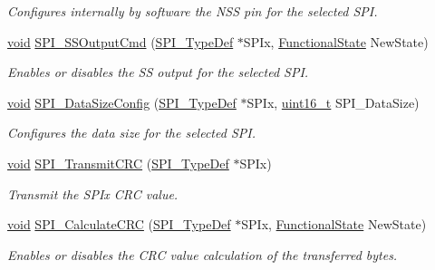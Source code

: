 \begin{DoxyCompactItemize}
\begin{DoxyCompactList}\small\item\em Configures internally by software the N\+SS pin for the selected S\+PI. \end{DoxyCompactList}\item 
\hyperlink{usb__devapi_8h_afabf60e7f57651d6d595a02c75f07cd0}{void} \hyperlink{group___s_p_i___private___functions_ga4ec54abdedf6cd17403d853a926d91c1}{S\+P\+I\+\_\+\+S\+S\+Output\+Cmd} (\hyperlink{struct_s_p_i___type_def}{S\+P\+I\+\_\+\+Type\+Def} $\ast$S\+P\+Ix, \hyperlink{agilefox_2library_2inc_2stm32f10x__type_8h_ac9a7e9a35d2513ec15c3b537aaa4fba1}{Functional\+State} New\+State)
\begin{DoxyCompactList}\small\item\em Enables or disables the SS output for the selected S\+PI. \end{DoxyCompactList}\item 
\hyperlink{usb__devapi_8h_afabf60e7f57651d6d595a02c75f07cd0}{void} \hyperlink{group___s_p_i___private___functions_gafc82e90841d7879535d655c035709cb1}{S\+P\+I\+\_\+\+Data\+Size\+Config} (\hyperlink{struct_s_p_i___type_def}{S\+P\+I\+\_\+\+Type\+Def} $\ast$S\+P\+Ix, \hyperlink{_p_e___types_8h_a1f1825b69244eb3ad2c7165ddc99c956}{uint16\+\_\+t} S\+P\+I\+\_\+\+Data\+Size)
\begin{DoxyCompactList}\small\item\em Configures the data size for the selected S\+PI. \end{DoxyCompactList}\item 
\hyperlink{usb__devapi_8h_afabf60e7f57651d6d595a02c75f07cd0}{void} \hyperlink{group___s_p_i___private___functions_gace8b1058e09bab150b0dbe5978810273}{S\+P\+I\+\_\+\+Transmit\+C\+RC} (\hyperlink{struct_s_p_i___type_def}{S\+P\+I\+\_\+\+Type\+Def} $\ast$S\+P\+Ix)
\begin{DoxyCompactList}\small\item\em Transmit the S\+P\+Ix C\+RC value. \end{DoxyCompactList}\item 
\hyperlink{usb__devapi_8h_afabf60e7f57651d6d595a02c75f07cd0}{void} \hyperlink{group___s_p_i___private___functions_ga64f7276d119e6cb58afc100f8832adb0}{S\+P\+I\+\_\+\+Calculate\+C\+RC} (\hyperlink{struct_s_p_i___type_def}{S\+P\+I\+\_\+\+Type\+Def} $\ast$S\+P\+Ix, \hyperlink{agilefox_2library_2inc_2stm32f10x__type_8h_ac9a7e9a35d2513ec15c3b537aaa4fba1}{Functional\+State} New\+State)
\begin{DoxyCompactList}\small\item\em Enables or disables the C\+RC value calculation of the transferred bytes. \end{DoxyCompactList}\item 

\end{DoxyCompactItemize}

